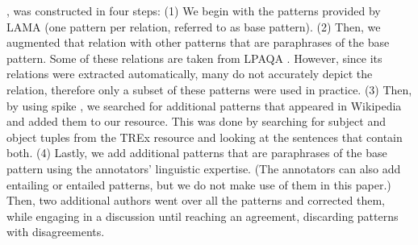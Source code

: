 
\resource{}, was constructed in four steps: (1) We begin
with the patterns provided by LAMA \cite{lama} (one pattern
per relation, referred to as base pattern). (2) Then, we
augmented that relation with other patterns that are
paraphrases of the base pattern. Some of these relations are
taken from LPAQA \cite{alpaqa}. However, since its relations
were extracted automatically, many do not accurately depict
the relation, therefore only a subset of these patterns were
used in practice.  (3) Then, by using spike \cite{spike}, we
searched for additional patterns that appeared in Wikipedia
and added them to our resource. This was done by searching
for subject and object tuples from the TREx resource and
looking at the sentences that contain both. (4) Lastly, we
add additional patterns that are paraphrases of the base
pattern using the annotators' linguistic
expertise.
(The annotators can also add entailing or entailed patterns,
but we do not make use of them in this paper.)
Then, two additional
authors went over all the patterns and corrected them, while
engaging in a discussion until reaching an agreement,
discarding patterns with disagreements.



